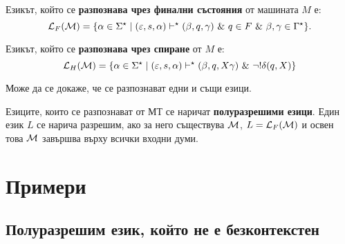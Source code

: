 Езикът, който се {\bf разпознава чрез финални състояния} от машината $M$ е:
\[\mathcal{L}_F(\mathcal{M}) = \{\alpha\in\Sigma^\star \mid (\varepsilon, s, \alpha) \vdash^\star (\beta, q, \gamma)\ \&\ q\in F\ \&\ \beta,\gamma\in\Gamma^\star\}.\]

Езикът, който се {\bf разпознава чрез спиране} от $M$ е:
\[\L_H(\M) = \{\alpha \in \Sigma^\star \mid (\varepsilon, s, \alpha) \vdash^\star (\beta, q, X\gamma)\ \&\ \neg !\delta(q,X)\}\]

Може да се докаже, че се разпознават едни и същи езици.

Езиците, които се разпознават от МТ се наричат {\bf полуразрешими езици}.
Един език $L$ се нарича разрешим, ако за него съществува $\mathcal{M}$, $L = \mathcal{L}_F(\mathcal{M})$
и освен това $\mathcal{M}$ завършва върху всички входни думи.

\section{Примери}

\subsection*{Полуразрешим език, който не е безконтекстен}

